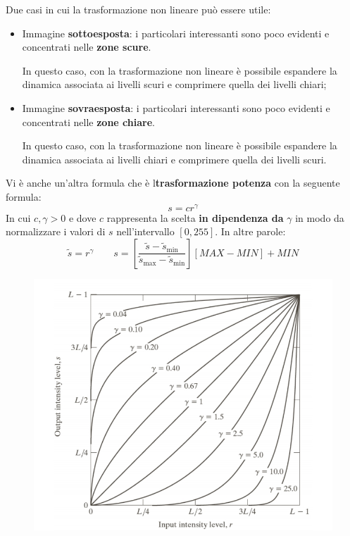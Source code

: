 \documentclass[a4paper]{article}
\begin{document}
	\noindent
	Due casi in cui la trasformazione non lineare può essere utile:
	\begin{itemize}
		\item Immagine \textbf{sottoesposta}: i particolari interessanti sono poco evidenti e concentrati nelle \textbf{zone scure}.
		
		In questo caso, con la trasformazione non lineare è possibile espandere la dinamica associata ai livelli scuri e comprimere quella dei livelli chiari;
		
		\item Immagine \textbf{sovraesposta}: i particolari interessanti sono poco evidenti e concentrati nelle \textbf{zone chiare}.
		
		In questo caso, con la trasformazione non lineare è possibile espandere la dinamica associata ai livelli chiari e comprimere quella dei livelli scuri.
	\end{itemize}
	Vi è anche un'altra formula che è l\textbf{trasformazione potenza} con la seguente formula:
	\begin{equation*}
		s = c r^{\gamma}
	\end{equation*}
	In cui $c,\gamma > 0$ e dove $c$ rappresenta la scelta \textbf{in dipendenza da} $\gamma$ in modo da normalizzare i valori di $s$ nell'intervallo $\left[0,255\right]$. In altre parole:
	\begin{equation*}
		\tilde{s} = r^{\gamma} \hspace{2em} s = \left[\dfrac{\tilde{s} - \tilde{s}_{\text{min}}}{\tilde{s}_{\text{max}} - \tilde{s}_{\text{min}}}\right] \left[MAX - MIN\right] + MIN
	\end{equation*}
	\begin{figure}[!htp]
		\centering
		\includegraphics[width=.8\textwidth]{img/lab/trasformazione_non_lineare.jpg}
	\end{figure}\newpage
	
\end{document}
